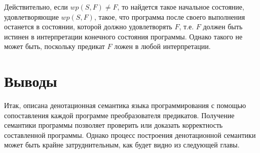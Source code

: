 Действительно, если $wp(S, F) \neq F$, то найдется такое начальное состояние, удовлетворяющие $wp(S, F)$, такое, что
программа после своего выполнения останется в состоянии, которой должно удовлетворять $F$, т.е. $F$ должен быть истинен
в интерпретации конечного состояния программы. Однако такого не может быть, поскольку предикат $F$ ложен в любой 
интерпретации.

\section{Выводы} \label{ch1:conclusion}
Итак, описана денотационная семантика языка программирования с помощью сопоставления каждой программе
преобразователя предикатов. Получение семантики программы позволяет проверить или доказать
корректность составленной программы. Однако процесс построения денотационной семантики может быть
крайне затруднительным, как будет видно из следующей главы.

%
